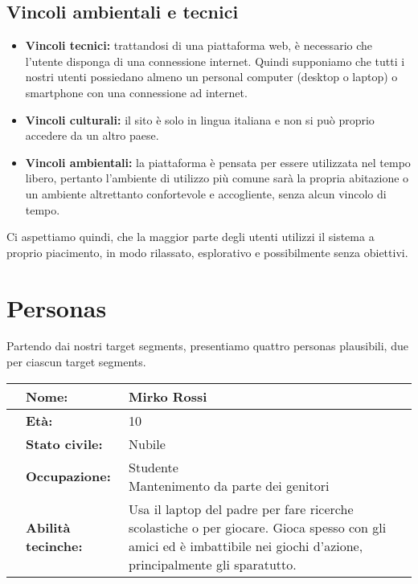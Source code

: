\documentclass[../Report.tex]{subfiles}
\begin{document}
        \subsection{Vincoli ambientali e tecnici}
        \begin{itemize}
            \item \textbf{Vincoli tecnici:} trattandosi di una piattaforma web, è necessario che l'utente disponga di una connessione internet. Quindi supponiamo che tutti i nostri utenti possiedano almeno un personal computer (desktop o laptop) o smartphone con una connessione ad internet.
            \item \textbf{Vincoli culturali:} il sito è solo in lingua italiana e non si può proprio accedere da un altro paese.
            \item \textbf{Vincoli ambientali:} la piattaforma è pensata per essere utilizzata nel tempo libero, pertanto l'ambiente di utilizzo più comune sarà la propria abitazione o un ambiente altrettanto confortevole e accogliente, senza alcun vincolo di tempo.
        \end{itemize}
        Ci aspettiamo quindi, che la maggior parte degli utenti utilizzi il sistema a proprio piacimento, in modo rilassato, esplorativo e possibilmente senza obiettivi.

    \section{Personas}
    Partendo dai nostri target segments, presentiamo quattro personas plausibili, due per ciascun target segments.\\
    \begin{table}[H]
        \begin{tabular}{|c|l|p{7cm}|}
            \hline
            & \textbf{Nome:} & Mirko Rossi\\
            \hline
            & \textbf{Età:} & 10 \\
            \hline
            & \textbf{Stato civile:} & Nubile \\
            \hline
            & \textbf{Occupazione:} & \makecell{Studente \\ Mantenimento da parte dei genitori} \\
            \hline
            & \textbf{Abilità tecinche:} & Usa il laptop del padre per fare ricerche scolastiche o per giocare. Gioca spesso con gli amici ed è imbattibile nei giochi d'azione, principalmente gli sparatutto. \\
            \hline
        \end{tabular}
    \end{table}
\end{document}
